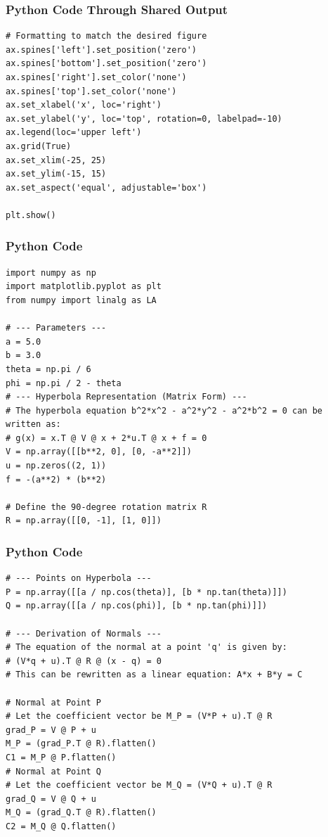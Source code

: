 \documentclass{beamer}
\begin{document}
\begin{frame}[fragile]
\frametitle{Python Code Through Shared Output}
\begin{lstlisting}
# Formatting to match the desired figure
ax.spines['left'].set_position('zero')
ax.spines['bottom'].set_position('zero')
ax.spines['right'].set_color('none')
ax.spines['top'].set_color('none')
ax.set_xlabel('x', loc='right')
ax.set_ylabel('y', loc='top', rotation=0, labelpad=-10)
ax.legend(loc='upper left')
ax.grid(True)
ax.set_xlim(-25, 25)
ax.set_ylim(-15, 15)
ax.set_aspect('equal', adjustable='box')

plt.show()
\end{lstlisting}
\end{frame}
\begin{frame}[fragile]
\frametitle{Python Code}
\begin{lstlisting}
import numpy as np
import matplotlib.pyplot as plt
from numpy import linalg as LA

# --- Parameters ---
a = 5.0
b = 3.0
theta = np.pi / 6
phi = np.pi / 2 - theta
# --- Hyperbola Representation (Matrix Form) ---
# The hyperbola equation b^2*x^2 - a^2*y^2 - a^2*b^2 = 0 can be written as:
# g(x) = x.T @ V @ x + 2*u.T @ x + f = 0
V = np.array([[b**2, 0], [0, -a**2]])
u = np.zeros((2, 1))
f = -(a**2) * (b**2)

# Define the 90-degree rotation matrix R
R = np.array([[0, -1], [1, 0]])
\end{lstlisting}
\end{frame}
\begin{frame}[fragile]
\frametitle{Python Code}
\begin{lstlisting}
# --- Points on Hyperbola ---
P = np.array([[a / np.cos(theta)], [b * np.tan(theta)]])
Q = np.array([[a / np.cos(phi)], [b * np.tan(phi)]])

# --- Derivation of Normals ---
# The equation of the normal at a point 'q' is given by:
# (V*q + u).T @ R @ (x - q) = 0
# This can be rewritten as a linear equation: A*x + B*y = C

# Normal at Point P
# Let the coefficient vector be M_P = (V*P + u).T @ R
grad_P = V @ P + u
M_P = (grad_P.T @ R).flatten()
C1 = M_P @ P.flatten()
# Normal at Point Q
# Let the coefficient vector be M_Q = (V*Q + u).T @ R
grad_Q = V @ Q + u
M_Q = (grad_Q.T @ R).flatten()
C2 = M_Q @ Q.flatten()
\end{lstlisting}
\end{frame}
\end{document}
